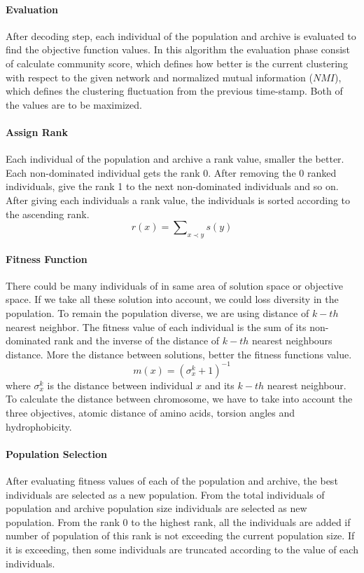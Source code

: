 \paragraph {Evaluation}
After decoding step, each individual of the population and archive is evaluated to find the objective function values. In this algorithm the evaluation phase consist of calculate community score, which defines how better is the current clustering with respect to the given network and normalized mutual information ($NMI$), which defines the clustering fluctuation from the previous time-stamp. Both of the values are to be maximized.
\paragraph {Assign Rank}
Each individual of the population and archive a rank value, smaller the better. Each non-dominated individual gets the rank 0. After removing the 0 ranked individuals, give the rank 1 to the next non-dominated individuals and so on. After giving each individuals a rank value, the individuals is sorted according to the ascending rank. 
\begin {equation}
r(x) = \sum\nolimits_{x\prec y} s(y)
\label {eq:rank}
\end {equation}

\paragraph {Fitness Function}
There could be many individuals of in same area of solution space or objective space. If we take all these solution into account, we could loss diversity in the population. To remain the population diverse, we are using distance of $k-th$ nearest neighbor. The fitness value of each individual is the sum of its non-dominated rank and the inverse of the distance of $k-th$ nearest neighbours distance.  More the distance between solutions, better the fitness functions value.
\begin{equation}
m(x) = {({\sigma}_x^k + 1)}^{-1}
\label{eq:density}
\end{equation}
where ${\sigma}_x^k$ is the distance between individual $x$ and its $k-th$ nearest neighbour. To calculate the distance between chromosome, we have to take into account the three objectives, atomic distance of amino acids, torsion angles and hydrophobicity.
\paragraph {Population Selection}
After evaluating fitness values of each of the population and archive, the best individuals are selected as a new population. From the total individuals of population and archive population size individuals are selected as new population. From the rank 0 to the highest rank, all the individuals are added if number of population of this rank is not exceeding the current population size. If it is exceeding, then some individuals are truncated according to the value of each individuals.
